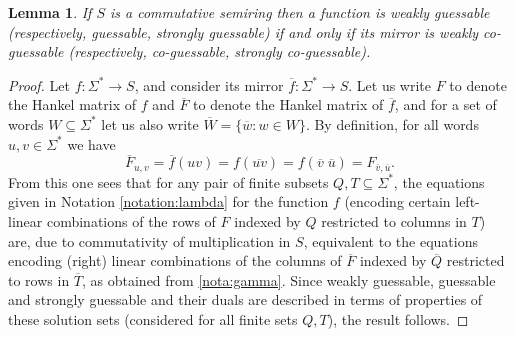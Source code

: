 \documentclass[10pt,a4paper]{amsart}
\newtheorem{lem}[thm]{Lemma}
\theoremstyle{definition}
\numberwithin{equation}{section}
\numberwithin{theorem}{section}
\begin{document}
\begin{lem}
\label{lem:com2}
If $S$ is a commutative semiring then a function is weakly guessable (respectively, guessable, strongly guessable) if and only if its mirror is weakly co-guessable (respectively, co-guessable, strongly co-guessable).
\end{lem}
\begin{proof}
Let $f: \Sigma^* \rightarrow S$, and consider its mirror $\overline{f}: \Sigma^* \rightarrow S$. Let us write $F$ to denote the Hankel matrix of $f$ and $\overline{F}$ to denote the Hankel matrix of $\overline{f}$, and for a set of words $W \subseteq \Sigma^*$ let us also write $\overline{W} = \{\overline{w}: w \in W\}$. By definition, for all words $u, v \in \Sigma^*$ we have $$\overline{F}_{u,v} = \overline{f}(uv) = f(\overline{uv}) = f(\overline{v} \; \overline{u}) = F_{\overline{v}, \overline{u}}.$$
From this one sees that for any pair of finite subsets $Q, T \subseteq \Sigma^*$, the equations given in Notation \ref{notation:lambda} for the function $f$ (encoding certain left-linear combinations of the rows of $F$ indexed by $Q$ restricted to columns in $T$)
are, due to commutativity of multiplication in $S$, equivalent to the equations  encoding (right) linear combinations of the columns of $\overline{F}$ indexed by $\overline{Q}$ restricted to rows in $\overline{T}$, as obtained from \ref{nota:gamma}. Since weakly guessable, guessable and strongly guessable and their duals are described in terms of properties of these solution sets (considered for all finite sets $Q, T$), the result follows. 
\end{proof}
\end{document}
